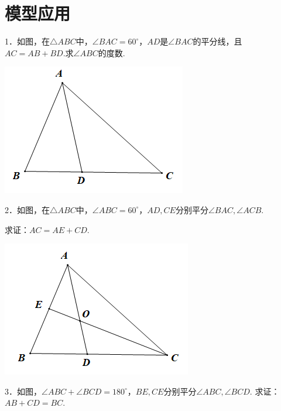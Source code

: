 \documentclass[10pt]{ctexart}
\begin{document}
\section{模型应用}

\begin{shaded}
	1．如图，在$\triangle ABC$中，$\angle BAC=60^\circ$，$AD$是$\angle BAC$的平分线，且$AC=AB+BD$.求$\angle ABC$的度数.
\end{shaded}

\begin{flushright}
	\includegraphics[scale=0.6]{figure/jiechangbuduan04}
\end{flushright}

\begin{shaded}
	2．如图，在$\triangle ABC$中，$\angle ABC=60^\circ$，$AD,CE$分别平分$\angle BAC,\angle ACB$.
	
	求证：$AC=AE+CD$.
\end{shaded}

\begin{flushright}
	\includegraphics[scale=0.6]{figure/jiechangbuduan05}
\end{flushright}

\begin{shaded}
	3．如图，$\angle ABC+\angle BCD=180^\circ$，$BE,CE$分别平分$\angle ABC,\angle BCD$.
	求证：$AB+CD=BC$.
\end{shaded}
\end{document}
